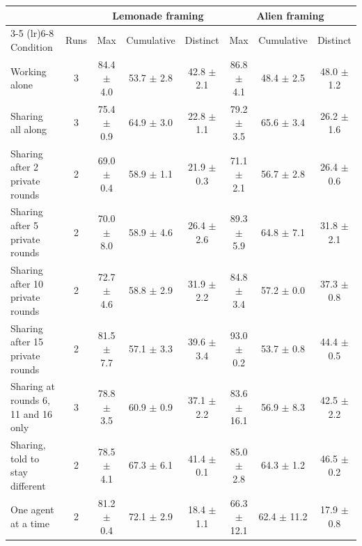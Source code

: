 \begin{tabular}{l c ccc ccc}
\toprule
 & & \multicolumn{3}{c}{Lemonade framing} & \multicolumn{3}{c}{Alien framing} \\
\cmidrule(lr){3-5} \cmidrule(lr){6-8}
Condition & Runs & Max & Cumulative & Distinct & Max & Cumulative & Distinct \\
\midrule
Working alone & 3 & 84.4 $\pm$ 4.0 & 53.7 $\pm$ 2.8 & 42.8 $\pm$ 2.1 & 86.8 $\pm$ 4.1 & 48.4 $\pm$ 2.5 & 48.0 $\pm$ 1.2 \\
Sharing all along & 3 & 75.4 $\pm$ 0.9 & 64.9 $\pm$ 3.0 & 22.8 $\pm$ 1.1 & 79.2 $\pm$ 3.5 & 65.6 $\pm$ 3.4 & 26.2 $\pm$ 1.6 \\
Sharing after 2 private rounds & 2 & 69.0 $\pm$ 0.4 & 58.9 $\pm$ 1.1 & 21.9 $\pm$ 0.3 & 71.1 $\pm$ 2.1 & 56.7 $\pm$ 2.8 & 26.4 $\pm$ 0.6 \\
Sharing after 5 private rounds & 2 & 70.0 $\pm$ 8.0 & 58.9 $\pm$ 4.6 & 26.4 $\pm$ 2.6 & 89.3 $\pm$ 5.9 & 64.8 $\pm$ 7.1 & 31.8 $\pm$ 2.1 \\
Sharing after 10 private rounds & 2 & 72.7 $\pm$ 4.6 & 58.8 $\pm$ 2.9 & 31.9 $\pm$ 2.2 & 84.8 $\pm$ 3.4 & 57.2 $\pm$ 0.0 & 37.3 $\pm$ 0.8 \\
Sharing after 15 private rounds & 2 & 81.5 $\pm$ 7.7 & 57.1 $\pm$ 3.3 & 39.6 $\pm$ 3.4 & 93.0 $\pm$ 0.2 & 53.7 $\pm$ 0.8 & 44.4 $\pm$ 0.5 \\
Sharing at rounds 6, 11 and 16 only & 3 & 78.8 $\pm$ 3.5 & 60.9 $\pm$ 0.9 & 37.1 $\pm$ 2.2 & 83.6 $\pm$ 16.1 & 56.9 $\pm$ 8.3 & 42.5 $\pm$ 2.2 \\
Sharing, told to stay different & 2 & 78.5 $\pm$ 4.1 & 67.3 $\pm$ 6.1 & 41.4 $\pm$ 0.1 & 85.0 $\pm$ 2.8 & 64.3 $\pm$ 1.2 & 46.5 $\pm$ 0.2 \\
One agent at a time & 2 & 81.2 $\pm$ 0.4 & 72.1 $\pm$ 2.9 & 18.4 $\pm$ 1.1 & 66.3 $\pm$ 12.1 & 62.4 $\pm$ 11.2 & 17.9 $\pm$ 0.8 \\
\bottomrule
\end{tabular}